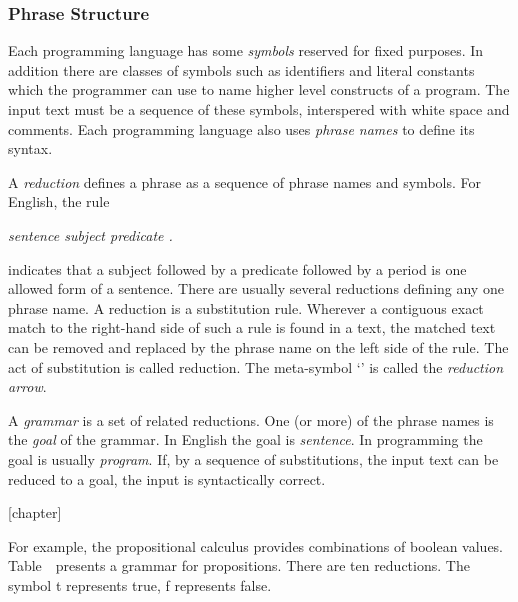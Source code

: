 \subsubsection{Phrase Structure}

Each programming language has some {\em symbols} reserved for fixed purposes.  
In addition there are classes of symbols 
such as identifiers and literal constants
which the programmer can use to name higher level constructs of a program.  
The input text must be a sequence of these symbols, 
interspered with white space and comments.  
Each programming language also uses {\em phrase names} to define its syntax.

A {\em reduction\/} defines a phrase as a sequence of phrase names and
symbols.  For English, the rule

{\em sentence \la subject predicate .}

\noindent
indicates that a subject followed by a predicate followed by a period 
is one allowed form of a sentence.  
There are usually several reductions defining any one phrase name.  
A reduction is a substitution rule.  
Wherever a contiguous exact match to the right-hand side of such a rule 
is found in a text, 
the matched text can be removed and replaced 
by the phrase name on the left side of the rule.  
The act of substitution is called reduction.  
The meta-symbol `\la' is called the {\em reduction arrow}.

A {\em grammar\/} is a set of related reductions.  
One (or more) of the phrase names is the {\em goal\/} of the grammar.  
In English the goal is {\em sentence}.  
In programming the goal is usually {\em program}.  
If, by a sequence of substitutions, 
the input text can be reduced to a goal, 
the input is syntactically correct.  

{}[chapter]
\setcounter{Reductions}{\value{table}}

For example, 
the propositional calculus provides combinations of boolean values.
Table~\theReductions\ presents a grammar for propositions.
There are ten reductions.  
The symbol t represents true, f represents false.

